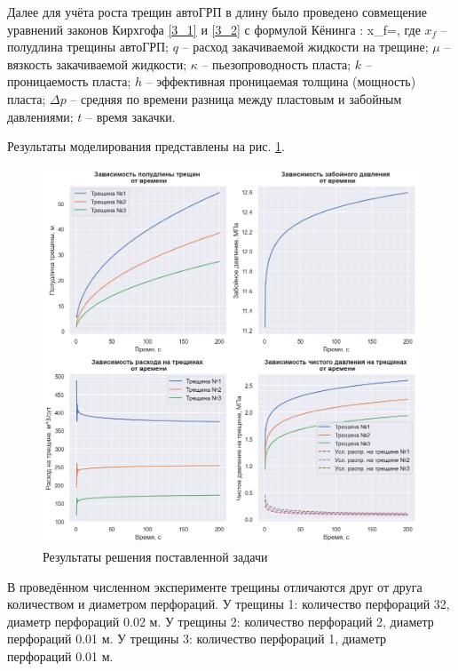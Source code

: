Далее для учёта роста трещин автоГРП в длину было проведено совмещение уравнений законов Кирхгофа \eqref{3_1} и \eqref{3_2} с формулой Кёнинга \cite{koning}:
\beq
x_f=,
\eeq
где $x_f$ -- полудлина трещины автоГРП;\newline
$q$ -- расход закачиваемой жидкости на трещине;\newline
$\mu$ -- вязкость закачиваемой жидкости;\newline
$\kappa$ -- пьезопроводность пласта;\newline
$k$ -- проницаемость пласта;\newline
$h$ -- эффективная проницаемая толщина (мощность) пласта;\newline
$\Delta p$ -- средняя по времени разница между пластовым и забойным давлениями;\newline
$t$ -- время закачки.

Результаты моделирования представлены на рис. \ref{fig:results2}.
 
\begin{figure}[H] 
\center
\includegraphics[width=.85\linewidth]{images/Kirchhoff+Koning.png}
\caption{Результаты решения поставленной задачи} 
\label{fig:results2}  
\end{figure}

В проведённом численном эксперименте трещины отличаются друг от друга количеством и диаметром перфораций.\newline
У трещины 1: количество перфораций 32, диаметр перфораций 0.02 м.\newline
У трещины 2: количество перфораций 2, диаметр перфораций 0.01 м.\newline
У трещины 3: количество перфораций 1, диаметр перфораций 0.01 м.
\\


